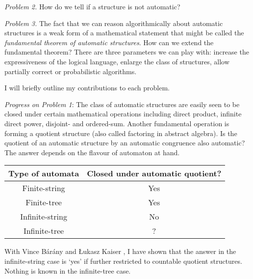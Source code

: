 \documentclass[12pt]{article}
\theoremstyle{plain} \numberwithin{equation}{section}
\theoremstyle{definition}
\begin{document}
{\em Problem 2.}  How do we tell if a structure is not automatic?

{\em Problem 3.}  
The fact that we can reason algorithmically about automatic structures is a weak form of a mathematical statement that might be called the {\em fundamental theorem of automatic structures}.  
How can we extend the fundamental theorem? There are three parameters we can play with: increase the expressiveness of the logical language, enlarge the class of structures, allow partially correct or probabilistic algorithms. 

I will briefly outline my contributions to each problem.

{\em Progress on Problem 1}:
The class of automatic structures are easily seen to be closed under certain mathematical operations including direct product, infinite direct power, disjoint- and ordered-sum. Another fundamental operation is forming a quotient structure (also called factoring in abstract algebra).
Is the quotient of an automatic structure by an automatic congruence also automatic? The answer depends on the flavour of automaton at hand. 

\begin{center}
\begin{tabular}{|c|c|}
\hline
Type of automata & Closed under automatic quotient? \\
\hline
Finite-string  	& Yes \cite{Blum99}		\\
Finite-tree 	& Yes	\cite{CoLo06}	\\
Infinite-string	& No \cite{HKMN07}\\
Infinite-tree	& ?		\\
\hline
\end{tabular}
\end{center}

With Vince B{\'a}r{\'a}ny and {\L}ukasz Kaiser \cite{BKRu08}, I have shown that the answer in the infinite-string case is `yes' if further restricted to countable quotient structures. Nothing is known in the infinite-tree case.
\end{document}
